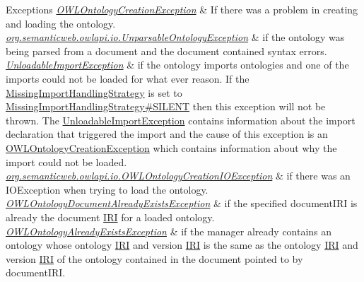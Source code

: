 \begin{DoxyExceptions}{Exceptions}
{\em \hyperlink{classorg_1_1semanticweb_1_1owlapi_1_1model_1_1_o_w_l_ontology_creation_exception}{O\-W\-L\-Ontology\-Creation\-Exception}} & If there was a problem in creating and loading the ontology. \\
\hline
{\em \hyperlink{classorg_1_1semanticweb_1_1owlapi_1_1io_1_1_unparsable_ontology_exception}{org.\-semanticweb.\-owlapi.\-io.\-Unparsable\-Ontology\-Exception}} & if the ontology was being parsed from a document and the document contained syntax errors. \\
\hline
{\em \hyperlink{classorg_1_1semanticweb_1_1owlapi_1_1model_1_1_unloadable_import_exception}{Unloadable\-Import\-Exception}} & if the ontology imports ontologies and one of the imports could not be loaded for what ever reason. If the \hyperlink{enumorg_1_1semanticweb_1_1owlapi_1_1model_1_1_missing_import_handling_strategy}{Missing\-Import\-Handling\-Strategy} is set to \hyperlink{enumorg_1_1semanticweb_1_1owlapi_1_1model_1_1_missing_import_handling_strategy_aed66060ec95dc4ad59ca4dd82509782b}{Missing\-Import\-Handling\-Strategy\#\-S\-I\-L\-E\-N\-T} then this exception will not be thrown. The {\ttfamily \hyperlink{classorg_1_1semanticweb_1_1owlapi_1_1model_1_1_unloadable_import_exception}{Unloadable\-Import\-Exception}} contains information about the import declaration that triggered the import and the cause of this exception is an {\ttfamily \hyperlink{classorg_1_1semanticweb_1_1owlapi_1_1model_1_1_o_w_l_ontology_creation_exception}{O\-W\-L\-Ontology\-Creation\-Exception}} which contains information about why the import could not be loaded. \\
\hline
{\em \hyperlink{classorg_1_1semanticweb_1_1owlapi_1_1io_1_1_o_w_l_ontology_creation_i_o_exception}{org.\-semanticweb.\-owlapi.\-io.\-O\-W\-L\-Ontology\-Creation\-I\-O\-Exception}} & if there was an {\ttfamily I\-O\-Exception} when trying to load the ontology. \\
\hline
{\em \hyperlink{classorg_1_1semanticweb_1_1owlapi_1_1model_1_1_o_w_l_ontology_document_already_exists_exception}{O\-W\-L\-Ontology\-Document\-Already\-Exists\-Exception}} & if the specified {\ttfamily document\-I\-R\-I} is already the document \hyperlink{classorg_1_1semanticweb_1_1owlapi_1_1model_1_1_i_r_i}{I\-R\-I} for a loaded ontology. \\
\hline
{\em \hyperlink{classorg_1_1semanticweb_1_1owlapi_1_1model_1_1_o_w_l_ontology_already_exists_exception}{O\-W\-L\-Ontology\-Already\-Exists\-Exception}} & if the manager already contains an ontology whose ontology \hyperlink{classorg_1_1semanticweb_1_1owlapi_1_1model_1_1_i_r_i}{I\-R\-I} and version \hyperlink{classorg_1_1semanticweb_1_1owlapi_1_1model_1_1_i_r_i}{I\-R\-I} is the same as the ontology \hyperlink{classorg_1_1semanticweb_1_1owlapi_1_1model_1_1_i_r_i}{I\-R\-I} and version \hyperlink{classorg_1_1semanticweb_1_1owlapi_1_1model_1_1_i_r_i}{I\-R\-I} of the ontology contained in the document pointed to by {\ttfamily document\-I\-R\-I}. \\
\hline
\end{DoxyExceptions}


